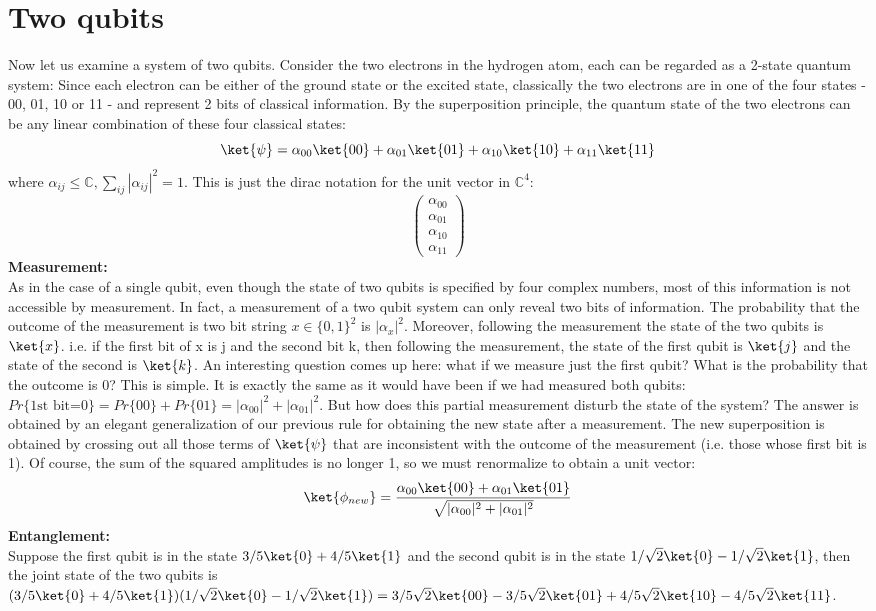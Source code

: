 \documentclass[12pt, oneside]{book}
\theoremstyle{definition}
\theoremstyle{definition}
\theoremstyle{remark}
\begin{document}
\section{Two qubits}
Now let us examine a system of two qubits. Consider the two electrons in the hydrogen atom, each can be regarded as a 2-state quantum system: Since each electron can be either of the ground state or the excited state, classically the two electrons are in one of the four states - 00, 01, 10 or 11 - and represent 2 bits of classical information. By the superposition principle, the quantum state of the two electrons can be any linear combination of these four classical states:
\[
    \ket{\psi}=\alpha_{00}\ket{00}+\alpha_{01}\ket{01}+\alpha_{10}\ket{10}+\alpha_{11}\ket{11}
\]
where $\alpha_{ij}\leq \mathbb{C}, \sum_{ij}|\alpha_{ij}|^2=1$. This is just the dirac notation for the unit vector in $\mathbb{C}^4$:
\[
\begin{pmatrix} \alpha_{00}\\\alpha_{01}\\ \alpha_{10} \\ \alpha_{11} \end{pmatrix}
\]
\textbf{Measurement: }\\
As in the case of a single qubit, even though the state of two qubits is specified by four complex numbers, most of this information is not accessible by measurement. In fact, a measurement of a two qubit system can only reveal two bits of information. The probability that the outcome of the measurement is two bit string $x \in \{0,1\}^2$ is $|\alpha_x|^2$. Moreover, following the measurement the state of the two qubits is $\ket{x}$. i.e. if the first bit of x is j and the second
bit k, then following the measurement, the state of the first qubit is $\ket{j}$ and
the state of the second is $\ket{k}$. An interesting question comes up here: what if we measure just the first qubit? What is the probability that the outcome is 0? This is simple. It is exactly the same as it would have been if we had measured both qubits:$Pr\{\text{1st bit=0}\}=Pr\{00\}+Pr\{01\}=|\alpha_{00}|^2+|\alpha_{01}|^2$. But how does this partial measurement disturb the state of the system? The answer is obtained by an elegant generalization of our previous rule for obtaining the new state after a measurement. The new superposition is obtained by crossing out all those terms of $\ket{\psi}$ that are inconsistent with the outcome of the measurement (i.e. those whose first bit is 1). Of course, the sum of the squared amplitudes is no longer 1, so we must renormalize to obtain a unit vector:
\[
\ket{\phi_{new}}=\frac{\alpha_{00}\ket{00}+\alpha_{01}\ket{01}}{\sqrt{|\alpha_{00}|^2+|\alpha_{01}|^2}}
\]
\textbf{Entanglement: }\\
Suppose the first qubit is in the state $3/5\ket{0}+4/5\ket{1}$ and the second qubit is in the state $1/\sqrt{2} \ket{0}-1/\sqrt{2}\ket{1}$, then the joint state of the two qubits is $(3/5\ket{0}+4/5\ket{1})(1/\sqrt{2}\ket{0}-1/\sqrt{2}\ket{1})=3/5\sqrt{2}\ket{00}-3/5\sqrt{2}\ket{01}+4/5\sqrt{2}\ket{10}-4/5\sqrt{2}\ket{11}$.
\end{document}

